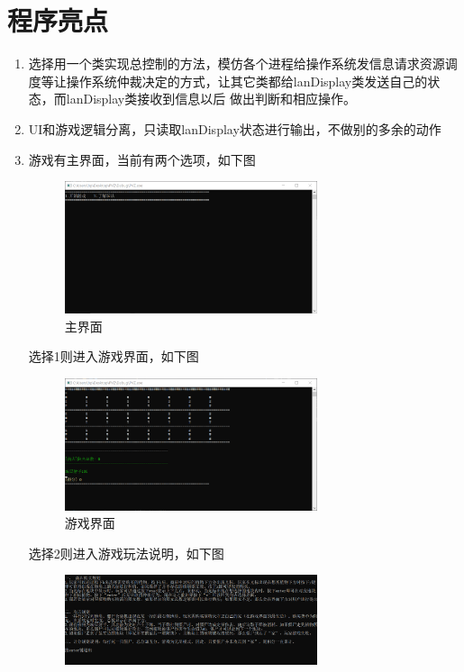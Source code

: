 \documentclass[12pt,a4paper,UTF8]{article}
\begin{document}
\section{程序亮点}
\begin{enumerate}
  \item 选择用一个类实现总控制的方法，模仿各个进程给操作系统发信息请求资源调度等让操作系统仲裁决定的方式，让其它类都给lanDisplay类发送自己的状态，而lanDisplay类接收到信息以后
  做出判断和相应操作。
  \item UI和游戏逻辑分离，只读取lanDisplay状态进行输出，不做别的多余的动作
  \item 游戏有主界面，当前有两个选项，如下图
  \begin{figure}[H]
    \centering
  \includegraphics[width=0.7\textwidth]{figure/main.png}
  \caption{主界面}
  \end{figure}
  选择1则进入游戏界面，如下图
  \begin{figure}[H]
    \centering
  \includegraphics[width=0.7\textwidth]{figure/game.png}
  \caption{游戏界面}
\end{figure}
  选择2则进入游戏玩法说明，如下图
  \begin{figure}[H]
    \centering
  \includegraphics[width=0.7\textwidth]{figure/rule.png}

\end{figure}
\end{enumerate}
\end{document}
